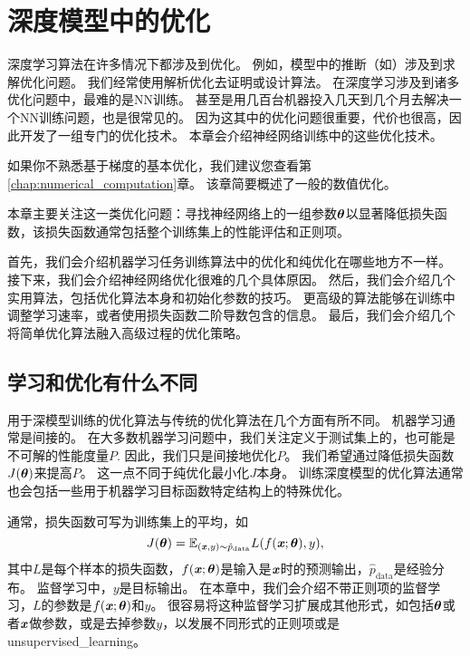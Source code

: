 \chapter{深度模型中的优化}
\label{chap:optimization_for_training_deep_models}
深度学习算法在许多情况下都涉及到优化。
例如，模型中的推断（如）涉及到求解优化问题。
我们经常使用解析优化去证明或设计算法。
在深度学习涉及到诸多优化问题中，最难的是\gls{NN}训练。
甚至是用几百台机器投入几天到几个月去解决一个\gls{NN}训练问题，也是很常见的。
因为这其中的优化问题很重要，代价也很高，因此开发了一组专门的优化技术。
本章会介绍神经网络训练中的这些优化技术。

如果你不熟悉基于梯度的基本优化，我们建议您查看第\ref{chap:numerical_computation}章。
该章简要概述了一般的数值优化。

本章主要关注这一类优化问题：寻找神经网络上的一组参数$\boldsymbol{\theta}$以显著降低损失函数，该损失函数通常包括整个训练集上的性能评估和正则项。

首先，我们会介绍机器学习任务训练算法中的优化和纯优化在哪些地方不一样。
接下来，我们会介绍神经网络优化很难的几个具体原因。
然后，我们会介绍几个实用算法，包括优化算法本身和初始化参数的技巧。
更高级的算法能够在训练中调整学习速率，或者使用损失函数二阶导数包含的信息。
最后，我们会介绍几个将简单优化算法融入高级过程的优化策略。


\section{学习和优化有什么不同}
\label{sec:how_learning_differs_from_pure_optimization}
用于深模型训练的优化算法与传统的优化算法在几个方面有所不同。
机器学习通常是间接的。
在大多数机器学习问题中，我们关注定义于测试集上的，也可能是不可解的性能度量$P$.
因此，我们只是间接地优化$P$。
我们希望通过降低损失函数$J(\boldsymbol{\theta})$来提高$P$。
这一点不同于纯优化最小化$J$本身。
训练深度模型的优化算法通常也会包括一些用于机器学习目标函数特定结构上的特殊优化。

通常，损失函数可写为训练集上的平均，如
\begin{equation}
\label{eq:8.1}
    J(\boldsymbol{\theta}) = \mathbb{E}_{(\boldsymbol{\mathit{x}}, y) \sim\hat{p}_\text{data}} L(f(\boldsymbol{\mathit{x}}; \boldsymbol{\theta}), y),
\end{equation}
其中$L$是每个样本的损失函数，$f(\boldsymbol{\mathit{x}};\boldsymbol{\theta})$是输入是$\boldsymbol{\mathit{x}}$时的预测输出，$\hat{p}_{\text{data}}$是经验分布。
监督学习中，$y$是目标输出。
在本章中，我们会介绍不带正则项的监督学习，$L$的参数是$f(\boldsymbol{\mathit{x}};\boldsymbol{\theta})$和$y$。
很容易将这种监督学习扩展成其他形式，如包括$\boldsymbol{\theta}$或者$\boldsymbol{\mathit{x}}$做参数，或是去掉参数$y$，以发展不同形式的正则项或是\gls{unsupervised_learning}。

